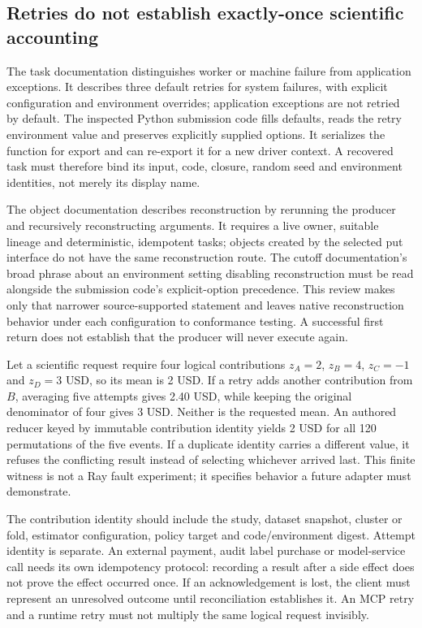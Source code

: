 \subsection{Retries do not establish exactly-once scientific accounting}
The task documentation distinguishes worker or machine failure from application exceptions. It describes three default retries for system failures, with explicit configuration and environment overrides; application exceptions are not retried by default. The inspected Python submission code fills defaults, reads the retry environment value and preserves explicitly supplied options. It serializes the function for export and can re-export it for a new driver context. A recovered task must therefore bind its input, code, closure, random seed and environment identities, not merely its display name.~\citep{exec24_ray_sources}

The object documentation describes reconstruction by rerunning the producer and recursively reconstructing arguments. It requires a live owner, suitable lineage and deterministic, idempotent tasks; objects created by the selected put interface do not have the same reconstruction route. The cutoff documentation's broad phrase about an environment setting disabling reconstruction must be read alongside the submission code's explicit-option precedence. This review makes only that narrower source-supported statement and leaves native reconstruction behavior under each configuration to conformance testing. A successful first return does not establish that the producer will never execute again.~\citep{exec24_ray_sources}

Let a scientific request require four logical contributions $z_A=2$, $z_B=4$, $z_C=-1$ and $z_D=3$ USD, so its mean is 2 USD. If a retry adds another contribution from $B$, averaging five attempts gives 2.40 USD, while keeping the original denominator of four gives 3 USD. Neither is the requested mean. An authored reducer keyed by immutable contribution identity yields 2 USD for all 120 permutations of the five events. If a duplicate identity carries a different value, it refuses the conflicting result instead of selecting whichever arrived last. This finite witness is not a Ray fault experiment; it specifies behavior a future adapter must demonstrate.~\citep{exec24_ray_contract}

The contribution identity should include the study, dataset snapshot, cluster or fold, estimator configuration, policy target and code/environment digest. Attempt identity is separate. An external payment, audit label purchase or model-service call needs its own idempotency protocol: recording a result after a side effect does not prove the effect occurred once. If an acknowledgement is lost, the client must represent an unresolved outcome until reconciliation establishes it. An MCP retry and a runtime retry must not multiply the same logical request invisibly.


